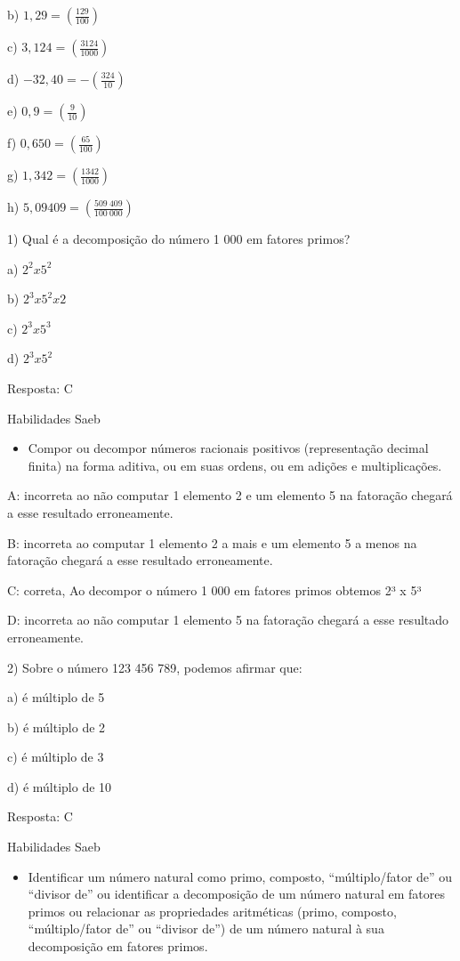 b) $1,29 = (\frac{129}{100})$

c) $3,124 = (\frac{3124}{1000})$

d) $-32,40 = -(\frac{324}{10})$

e) $0,9 = (\frac{9}{10})$

f) $0,650 = (\frac{65}{100})$

g) $1,342 = (\frac{1342}{1000})$

h) $5,09409 = (\frac{509\ 409}{100\ 000})$


1) Qual é a decomposição do número 1 000 em fatores primos?

a) $2^2 x 5^2$

b) $2^3 x 5^2 x 2$

c) $2^3 x 5^3$

d) $2^3x5^2$

Resposta: C

Habilidades Saeb

\begin{itemize}
\tightlist
\item
  Compor ou decompor números racionais positivos (representação decimal
  finita) na forma aditiva, ou em suas ordens, ou em adições e
  multiplicações.
\end{itemize}

A: incorreta ao não computar 1 elemento 2 e um elemento 5 na fatoração
chegará a esse resultado erroneamente.

B: incorreta ao computar 1 elemento 2 a mais e um elemento 5 a menos na
fatoração chegará a esse resultado erroneamente.

C: correta, Ao decompor o número 1 000 em fatores primos obtemos 2³ x 5³

D: incorreta ao não computar 1 elemento 5 na fatoração chegará a esse
resultado erroneamente.

2) Sobre o número 123 456 789, podemos afirmar que:

a) é múltiplo de 5

b) é múltiplo de 2

c) é múltiplo de 3

d) é múltiplo de 10

Resposta: C

Habilidades Saeb

\begin{itemize}
\tightlist
\item
  Identificar um número natural como primo, composto, ``múltiplo/fator
  de'' ou ``divisor de'' ou identificar a decomposição de um número
  natural em fatores primos ou relacionar as propriedades aritméticas
  (primo, composto, ``múltiplo/fator de'' ou ``divisor de'') de um
  número natural à sua decomposição em fatores primos.
\end{itemize}

